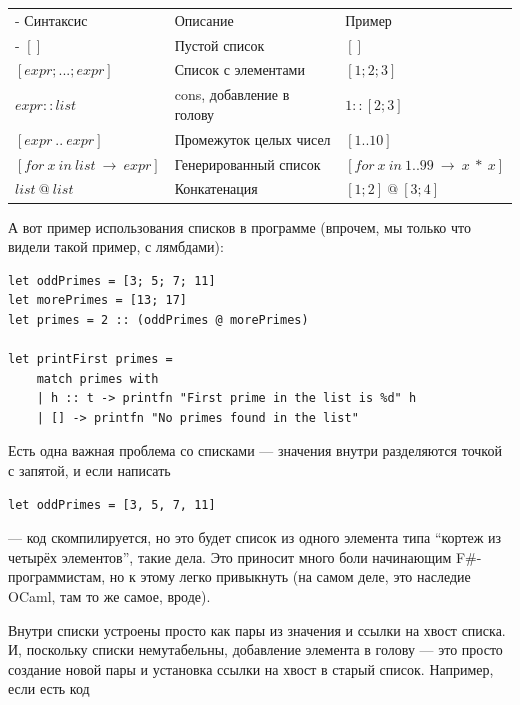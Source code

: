 \documentclass[a5paper]{article}
\begin{document}
\begin{tabu} {| X[0.9 l p] | X[1 l p] | X[1 l p] |}
	\tabucline-
	Синтаксис                               & Описание                  & Пример                             \\
	\tabucline-
	\everyrow{\tabucline-}
	$[]$                                    & Пустой список             & $[]$                               \\
	$[expr; ...; expr]$                     & Список с элементами       & $[1; 2; 3]$                        \\
	$expr :: list$                          & cons, добавление в голову & $1 :: [2; 3]$                      \\
	$[expr\ ..\ expr]$                      & Промежуток целых чисел    & $[1 .. 10]$                        \\
	$[for\ x\ in\ list\ \rightarrow\ expr]$ & Генерированный список     & $[for\ x\ in\ 1..99\ \rightarrow\ x\ *\ x]$ \\
	$list\ @\ list$                         & Конкатенация              & $[1; 2]\ @\ [3; 4]$                \\
\end{tabu}

А вот пример использования списков в программе (впрочем, мы только что видели такой пример, с лямбдами):

\begin{verbatim}
let oddPrimes = [3; 5; 7; 11]
let morePrimes = [13; 17]
let primes = 2 :: (oddPrimes @ morePrimes)

let printFirst primes =
    match primes with
    | h :: t -> printfn "First prime in the list is %d" h
    | [] -> printfn "No primes found in the list"
\end{verbatim}

Есть одна важная проблема со списками --- значения внутри разделяются точкой с запятой, и если написать

\begin{verbatim}
let oddPrimes = [3, 5, 7, 11]
\end{verbatim}

--- код скомпилируется, но это будет список из одного элемента типа ``кортеж из четырёх элементов'', такие дела. Это приносит много боли начинающим F\#-программистам, но к этому легко привыкнуть (на самом деле, это наследие OCaml, там то же самое, вроде).

Внутри списки устроены просто как пары из значения и ссылки на хвост списка. И, поскольку списки немутабельны, добавление элемента в голову --- это просто создание новой пары и установка ссылки на хвост в старый список. Например, если есть код
\end{document}

